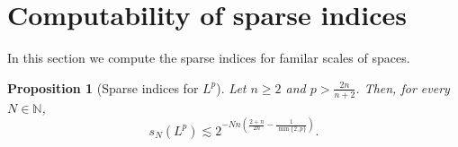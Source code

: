 \documentclass[11pt, a4paper,leqno]{amsart}
\theoremstyle{plain}
\newtheorem{proposition}{Proposition}
\numberwithin{equation}{section}
\theoremstyle{definition}
\theoremstyle{remark}
\def\R{\mathbb{R}}
\begin{document}
\section{Computability of sparse indices\label{Section4.2}}

In this section we compute the sparse indices for familar scales of spaces.


\begin{proposition}
[Sparse indices for $L^{p}$]\label{ThmSparseLebesgue} Let $n\geq2$ and 
$p>\frac{2n}{n+2}$.  Then, for every $N\in\mathbb{N}$,
\begin{equation}
s_{N}(L^p)\lesssim 2^{-Nn(\frac{2+n}{2n}-\frac{1}{\min\{2,p\}})}. \label{sNLp}%
\end{equation}
\end{proposition}


\end{document}
